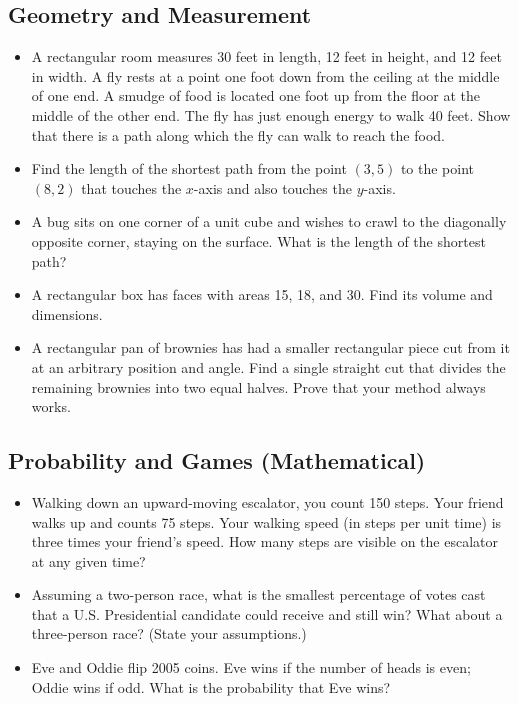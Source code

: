\documentclass[12pt]{article}
\begin{document}
\subsection{Geometry and Measurement}
\begin{itemize}
  \item A rectangular room measures 30 feet in length, 12 feet in height, and 12 feet in width. A fly rests at a point one foot down from the ceiling at the middle of one end. A smudge of food is located one foot up from the floor at the middle of the other end. The fly has just enough energy to walk 40 feet. Show that there is a path along which the fly can walk to reach the food.

  \item Find the length of the shortest path from the point $(3, 5)$ to the point $(8, 2)$ that touches the $x$-axis and also touches the $y$-axis.

  \item A bug sits on one corner of a unit cube and wishes to crawl to the diagonally opposite corner, staying on the surface. What is the length of the shortest path?

  \item A rectangular box has faces with areas 15, 18, and 30. Find its volume and dimensions.
  
  \item A rectangular pan of brownies has had a smaller rectangular piece cut from it at an arbitrary position and angle. Find a single straight cut that divides the remaining brownies into two equal halves. Prove that your method always works.
\end{itemize}

\subsection{Probability and Games (Mathematical)}
\begin{itemize}
  \item Walking down an upward-moving escalator, you count 150 steps. Your friend walks up and counts 75 steps. Your walking speed (in steps per unit time) is three times your friend's speed. How many steps are visible on the escalator at any given time?

  \item Assuming a two-person race, what is the smallest percentage of votes cast that a U.S. Presidential candidate could receive and still win? What about a three-person race? (State your assumptions.)

  \item Eve and Oddie flip 2005 coins. Eve wins if the number of heads is even; Oddie wins if odd. What is the probability that Eve wins?
\end{itemize}
\end{document}
